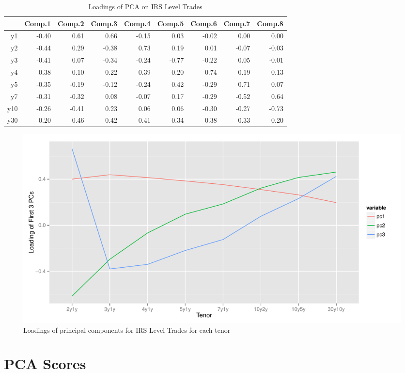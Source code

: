 \begin{table}[ht]
\centering
\begin{tabu}{rrrrrrrrr}
  \toprule
 & Comp.1 & Comp.2 & Comp.3 & Comp.4 & Comp.5 & Comp.6 & Comp.7 & Comp.8 \\ 
  \midrule
y1 & -0.40 & 0.61 & 0.66 & -0.15 & 0.03 & -0.02 & 0.00 & 0.00 \\ 
  y2 & -0.44 & 0.29 & -0.38 & 0.73 & 0.19 & 0.01 & -0.07 & -0.03 \\ 
  y3 & -0.41 & 0.07 & -0.34 & -0.24 & -0.77 & -0.22 & 0.05 & -0.01 \\ 
  y4 & -0.38 & -0.10 & -0.22 & -0.39 & 0.20 & 0.74 & -0.19 & -0.13 \\ 
  y5 & -0.35 & -0.19 & -0.12 & -0.24 & 0.42 & -0.29 & 0.71 & 0.07 \\ 
  y7 & -0.31 & -0.32 & 0.08 & -0.07 & 0.17 & -0.29 & -0.52 & 0.64 \\ 
  y10 & -0.26 & -0.41 & 0.23 & 0.06 & 0.06 & -0.30 & -0.27 & -0.73 \\ 
  y30 & -0.20 & -0.46 & 0.42 & 0.41 & -0.34 & 0.38 & 0.33 & 0.20 \\ 
   \bottomrule
\end{tabu}
\caption{Loadings of PCA on IRS Level Trades}
\label{table:pca-loadings-level}
\end{table}

\begin{figure}[H]
\centering\includegraphics[width=\textwidth]{pca-loadings-vanilla.pdf}
\caption{Loadings of principal components for IRS Level Trades for each tenor}
\label{fig:pca-loadings-vanilla}
\end{figure}

\section{PCA Scores}

